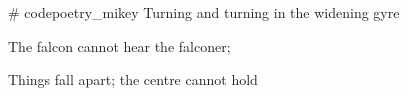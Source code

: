 # codepoetry_mikey
Turning and turning in the widening gyre

The falcon cannot hear the falconer;

Things fall apart; the centre cannot hold
